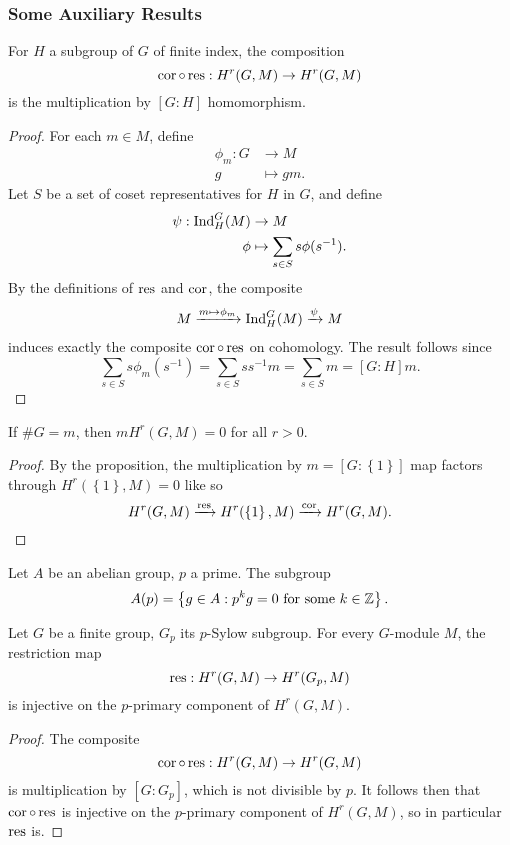 \subsubsection{Some Auxiliary Results}
\begin{proposition}
	For $H$ a subgroup of $G$ of finite index, the composition
	\[
		\operatorname{cor}\circ\operatorname{res}:H^{r}(G,M)\to H^{r}(G,M)
	\] 
	is the multiplication by $[G:H]$ homomorphism.
\end{proposition}
\begin{proof}
	For each $m\in M$, define
	\begin{align*}
		\phi_m:G&\to M\\
		g&\mapsto gm
	.\end{align*}
	Let $S$ be a set of coset representatives for $H$ in $G$, and define
	\begin{align*}
		\psi:\operatorname{Ind}^{G}_H(M)&\to M\\
		\phi&\mapsto\sum\limits_{s\in S}s\phi(s^{-1})
	.\end{align*}
	By the definitions of $\operatorname{res}$ and $\operatorname{cor}$, the composite
	\begin{align*}
		M\xrightarrow{m\mapsto\phi_m}\operatorname{Ind}^{G}_H(M)\xrightarrow{\psi}M
	\end{align*}
	induces exactly the composite $\operatorname{cor}\circ\operatorname{res}$ on cohomology. The result follows since
	\[
		\sum\limits_{s\in S}s\phi_m(s^{-1})=\sum\limits_{s\in S}ss^{-1}m=\sum\limits_{s\in S}m=[G:H]m
	.\] 
\end{proof}
\begin{corollary}\label{cor:mult-triv}
	If $\#G=m$, then $mH^{r}(G,M)=0$ for all $r>0$.
\end{corollary}
\begin{proof}
	By the proposition, the multiplication by $m=[G:\left\lbrace 1\right\rbrace]$ map factors through $H^{r}(\left\lbrace 1\right\rbrace,M)=0$ like so
	\[
		H^{r}(G,M)\xrightarrow{\operatorname{res}}H^{r}(\left\lbrace 1\right\rbrace,M)\xrightarrow{\operatorname{cor}} H^{r}(G,M)
	.\] 
\end{proof}
Let $A$ be an abelian group, $p$ a prime. The subgroup
\[
	A(p)=\left\lbrace g\in A:p^{k}g=0 \text{ for some }k\in\mathbb{Z}\right\rbrace
.\] 
\begin{corollary}
	Let $G$ be a finite group, $G_p$ its $p$-Sylow subgroup. For every $G$-module $M$, the restriction map
	\[
		\operatorname{res}:H^{r}(G,M)\to H^{r}(G_p,M)
	\] 
	is injective on the $p$-primary component of $H^{r}(G,M)$.
\end{corollary}
\begin{proof}
	The composite
	\[
		\operatorname{cor}\circ\operatorname{res}:H^{r}(G,M)\to H^{r}(G,M)
	\] 
	is multiplication by $[G:G_p]$, which is not divisible by $p$. It follows then that $\operatorname{cor}\circ\operatorname{res}$ is injective on the $p$-primary component of $H^{r}(G,M)$, so in particular $\operatorname{res}$ is.
\end{proof}

